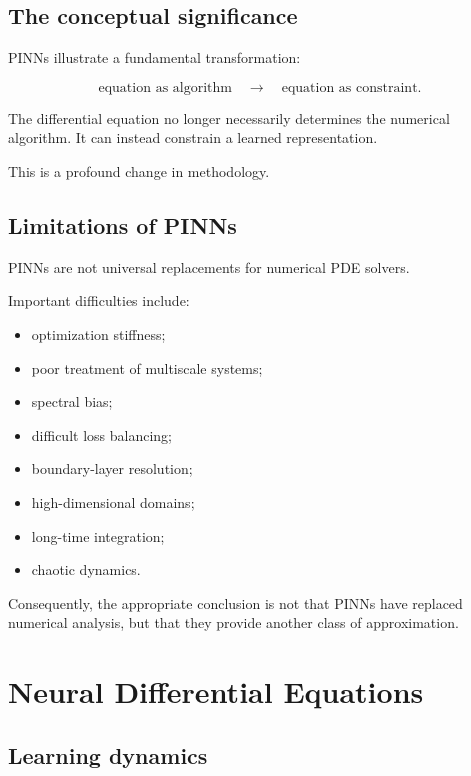 \documentclass[11pt,a4paper,oneside]{book}
\begin{document}
\section{The conceptual significance}

PINNs illustrate a fundamental transformation:

\begin{equation}
\boxed{
\text{equation as algorithm}
\quad\longrightarrow\quad
\text{equation as constraint}.
}
\end{equation}

The differential equation no longer necessarily determines the numerical
algorithm. It can instead constrain a learned representation.

This is a profound change in methodology.

\section{Limitations of PINNs}

PINNs are not universal replacements for numerical PDE solvers.

Important difficulties include:

\begin{itemize}
\item optimization stiffness;
\item poor treatment of multiscale systems;
\item spectral bias;
\item difficult loss balancing;
\item boundary-layer resolution;
\item high-dimensional domains;
\item long-time integration;
\item chaotic dynamics.
\end{itemize}

Consequently, the appropriate conclusion is not that PINNs have replaced
numerical analysis, but that they provide another class of approximation.

\chapter{Neural Differential Equations}

\section{Learning dynamics}
\end{document}
